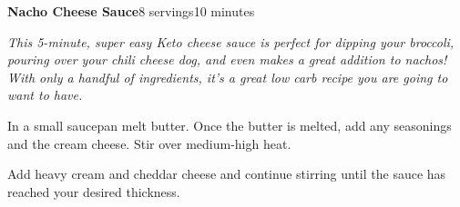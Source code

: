 \documentclass[../recipe-collections/cooking.tex]{subfiles}
\begin{document}
\begin{recipe}{\textbf{Nacho Cheese Sauce}}{8 servings}{10 minutes}

  \freeform{}\textit{This 5-minute, super easy Keto cheese sauce is 
  perfect for dipping your broccoli, pouring over your chili cheese 
  dog, and even makes a great addition to nachos! With only a handful 
  of ingredients, it's a great low carb recipe you are going to want 
  to have.}


  In a small saucepan melt butter. Once the butter is melted, add any 
  seasonings and the cream cheese. Stir over medium-high heat. 


  Add heavy cream and cheddar cheese and continue stirring until the 
  sauce has reached your desired thickness. 


\end{recipe}
\end{document}
